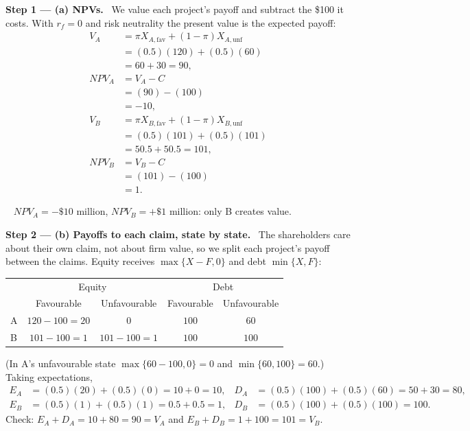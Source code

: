 \documentclass[11pt,a4paper]{article}
\newcommand{\step}[2]{\par\medskip\noindent\textbf{Step #1 --- #2.}~}
\newcommand{\answer}[1]{\par\smallskip\noindent\fbox{\textbf{Answer #1.}}~}
\begin{document}
\step{1}{(a) NPVs} We value each project's payoff and subtract the \$100 it costs. With $r_f=0$
and risk neutrality the present value is the expected payoff:
\begin{align}
  V_A &= \pi X_{A,\text{fav}}+(1-\pi)X_{A,\text{unf}} \label{t4e2-VA}\\
      &= (0.5)(120)+(0.5)(60) \nonumber\\
      &= 60+30 = 90, \nonumber\\
  \mathit{NPV}_A &= V_A-C \label{t4e2-NA}\\
      &= (90)-(100) \nonumber\\
      &= -10, \nonumber\\
  V_B &= \pi X_{B,\text{fav}}+(1-\pi)X_{B,\text{unf}} \label{t4e2-VB}\\
      &= (0.5)(101)+(0.5)(101) \nonumber\\
      &= 50.5+50.5 = 101, \nonumber\\
  \mathit{NPV}_B &= V_B-C \nonumber\\
      &= (101)-(100) \nonumber\\
      &= 1. \nonumber
\end{align}

\answer{(a)} $\mathit{NPV}_A=-\$10$ million, $\mathit{NPV}_B=+\$1$ million: only B creates value.

\step{2}{(b) Payoffs to each claim, state by state} The shareholders care about their own claim,
not about firm value, so we split each project's payoff between the claims. Equity receives
$\max\{X-F,0\}$ and debt $\min\{X,F\}$:
\begin{center}
\begin{tabular}{lcccc}
\toprule
 & \multicolumn{2}{c}{Equity} & \multicolumn{2}{c}{Debt}\\
 & Favourable & Unfavourable & Favourable & Unfavourable\\
\midrule
A & $120-100=20$ & $0$ & $100$ & $60$\\
B & $101-100=1$ & $101-100=1$ & $100$ & $100$\\
\bottomrule
\end{tabular}
\end{center}
(In A's unfavourable state $\max\{60-100,0\}=0$ and $\min\{60,100\}=60$.) Taking expectations,
\begin{align}
  E_A &= (0.5)(20)+(0.5)(0) = 10+0 = 10, & D_A &= (0.5)(100)+(0.5)(60) = 50+30 = 80, \label{t4e2-A}\\
  E_B &= (0.5)(1)+(0.5)(1) = 0.5+0.5 = 1, & D_B &= (0.5)(100)+(0.5)(100) = 100. \label{t4e2-B}
\end{align}
Check: $E_A+D_A=10+80=90=V_A$ and $E_B+D_B=1+100=101=V_B$.
\end{document}
